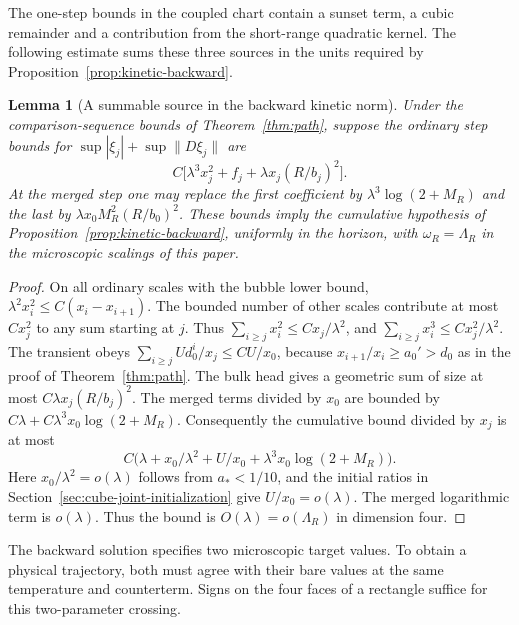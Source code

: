 \documentclass[11pt]{article}
\newtheorem{lemma}[theorem]{Lemma}
\theoremstyle{definition}
\begin{document}
The one-step bounds in the coupled chart contain a sunset term, a
cubic remainder and a contribution from the short-range quadratic
kernel. The following estimate sums these three sources in the units
required by Proposition~\ref{prop:kinetic-backward}.

\begin{lemma}[A summable source in the backward kinetic norm]
\label{lem:kinetic-backward-sum}
Under the comparison-sequence bounds of Theorem~\ref{thm:path},
suppose the ordinary step bounds for
\(\sup|\xi_j|+\sup\|D\xi_j\|\) are
\begin{equation}
 C\bigl[\lambda^3x_j^2+f_j
              +\lambda x_j(R/b_j)^2\bigr].
\end{equation}
At the merged step one may replace the first coefficient by
\(\lambda^3\log(2+M_R)\) and the last by
\(\lambda x_0 M_R^2(R/b_0)^2\).
These bounds imply the cumulative hypothesis of
Proposition~\ref{prop:kinetic-backward}, uniformly in the horizon,
with \(\omega_R=\Lambda_R\) in the microscopic scalings of this
paper.
\end{lemma}
\begin{proof}
On all ordinary scales with the bubble lower bound,
\(\lambda^2 x_i^2\le C(x_i-x_{i+1})\).
The bounded number of other scales contribute at most
\(Cx_j^2\) to any sum starting at \(j\). Thus
\(\sum_{i\ge j}x_i^2\le Cx_j/\lambda^2\), and
\(\sum_{i\ge j}x_i^3\le Cx_j^2/\lambda^2\).
The transient obeys
\(\sum_{i\ge j}Ud_0^i/x_j\le C U/x_0\), because
\(x_{i+1}/x_i\ge a_0'>d_0\) as in the proof of
Theorem~\ref{thm:path}. The bulk head gives a geometric
sum of size at most \(C\lambda x_j(R/b_j)^2\).
The merged terms divided by \(x_0\) are bounded by
\(C\lambda+C\lambda^3x_0\log(2+M_R)\).
Consequently the cumulative bound divided by \(x_j\)
is at most
\begin{equation}
 C\bigl(\lambda+x_0/\lambda^2+U/x_0
                +\lambda^3 x_0\log(2+M_R)\bigr).
\end{equation}
Here \(x_0/\lambda^2=o(\lambda)\) follows from \(a_*<1/10\),
and the initial ratios in Section~\ref{sec:cube-joint-initialization}
give \(U/x_0=o(\lambda)\). The merged logarithmic term is
\(o(\lambda)\). Thus the bound is \(O(\lambda)=o(\Lambda_R)\)
in dimension four.
\end{proof}

The backward solution specifies two microscopic target values. To
obtain a physical trajectory, both must agree with their bare values
at the same temperature and counterterm. Signs on the four faces
of a rectangle suffice for this two-parameter crossing.
\end{document}
